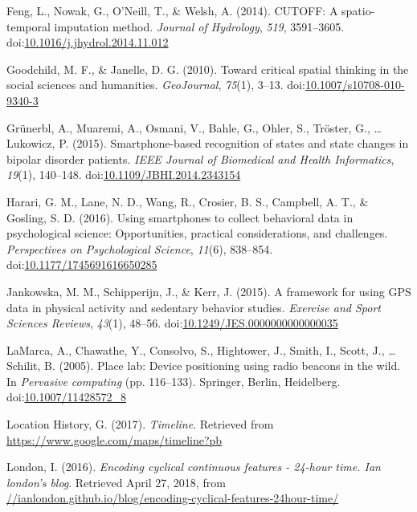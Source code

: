 \documentclass[man]{apa6}
\theoremstyle{definition}
\theoremstyle{definition}
\theoremstyle{definition}
\theoremstyle{remark}
\begin{document}
\hypertarget{ref-feng_cutoff:_2014}{}
Feng, L., Nowak, G., O'Neill, T., \& Welsh, A. (2014). CUTOFF: A
spatio-temporal imputation method. \emph{Journal of Hydrology},
\emph{519}, 3591--3605.
doi:\href{https://doi.org/10.1016/j.jhydrol.2014.11.012}{10.1016/j.jhydrol.2014.11.012}

\hypertarget{ref-goodchild_toward_2010}{}
Goodchild, M. F., \& Janelle, D. G. (2010). Toward critical spatial
thinking in the social sciences and humanities. \emph{GeoJournal},
\emph{75}(1), 3--13.
doi:\href{https://doi.org/10.1007/s10708-010-9340-3}{10.1007/s10708-010-9340-3}

\hypertarget{ref-grunerbl_smartphone-based_2015}{}
Grünerbl, A., Muaremi, A., Osmani, V., Bahle, G., Ohler, S., Tröster,
G., \ldots{} Lukowicz, P. (2015). Smartphone-based recognition of states
and state changes in bipolar disorder patients. \emph{IEEE Journal of
Biomedical and Health Informatics}, \emph{19}(1), 140--148.
doi:\href{https://doi.org/10.1109/JBHI.2014.2343154}{10.1109/JBHI.2014.2343154}

\hypertarget{ref-harari_using_2016}{}
Harari, G. M., Lane, N. D., Wang, R., Crosier, B. S., Campbell, A. T.,
\& Gosling, S. D. (2016). Using smartphones to collect behavioral data
in psychological science: Opportunities, practical considerations, and
challenges. \emph{Perspectives on Psychological Science}, \emph{11}(6),
838--854.
doi:\href{https://doi.org/10.1177/1745691616650285}{10.1177/1745691616650285}

\hypertarget{ref-jankowska_framework_2015}{}
Jankowska, M. M., Schipperijn, J., \& Kerr, J. (2015). A framework for
using GPS data in physical activity and sedentary behavior studies.
\emph{Exercise and Sport Sciences Reviews}, \emph{43}(1), 48--56.
doi:\href{https://doi.org/10.1249/JES.0000000000000035}{10.1249/JES.0000000000000035}

\hypertarget{ref-lamarca_place_2005}{}
LaMarca, A., Chawathe, Y., Consolvo, S., Hightower, J., Smith, I.,
Scott, J., \ldots{} Schilit, B. (2005). Place lab: Device positioning
using radio beacons in the wild. In \emph{Pervasive computing} (pp.
116--133). Springer, Berlin, Heidelberg.
doi:\href{https://doi.org/10.1007/11428572_8}{10.1007/11428572\_8}

\hypertarget{ref-location_history_timeline_2017}{}
Location History, G. (2017). \emph{Timeline}. Retrieved from
\url{https://www.google.com/maps/timeline?pb}

\hypertarget{ref-london_encoding_2016}{}
London, I. (2016). \emph{Encoding cyclical continuous features - 24-hour
time. Ian london's blog}. Retrieved April 27, 2018, from
\url{//ianlondon.github.io/blog/encoding-cyclical-features-24hour-time/}
\end{document}
